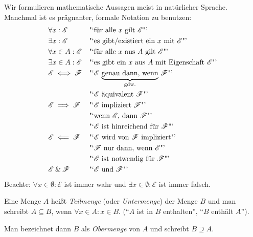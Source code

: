 \documentclass[../../main.tex]{subfiles}
\begin{document}
\begin{bemnt}\label{1.1.11}
Wir formulieren mathematische Aussagen meist in natürlicher Sprache. Manchmal ist es prägnanter, formale Notation zu benutzen:
\begin{align*}
& \forall x:\mathcal{E}&&\text{"`für alle $x$ gilt $\mathcal{E}$"'}\index{Allquantor@{\bf Allquantor} ($\forall$)}\\
& \exists x:\mathcal{E}&&\text{"`es gibt/existiert ein $x$ mit $\mathcal{E}$"'}\index{Existenzquantor@{\bf Existenzquantor} ($\exists$)}\\
& \forall x\in A:\mathcal{E}&&\text{"`für alle $x$ aus $A$ gilt $\mathcal{E}$"'}\\
& \exists x\in A:\mathcal{E}&&\text{"`es gibt ein $x$ aus $A$ mit Eigenschaft $\mathcal{E}$"'}\\
& \mathcal{E}\iff \mathcal{F}&& \text{"`$\mathcal{E}$
$\underbrace{\text{genau dann, wenn}}_{\text{gdw.}}$
$\mathcal{F}$"'}\index{Äquivalenz@{\bf Äquivalenz} ($\iff$)}\\
& && \text{"`$\mathcal{E}$ äquivalent $\mathcal{F}$"'}\\
& \mathcal{E} \implies \mathcal{F} && \text{"`$\mathcal{E}$ impliziert $\mathcal{F}$"'}\index{Implikation@{\bf Implikation} ($\implies$, $\impliedby$)}\\
& && \text{"`wenn $\mathcal{E}$, dann $\mathcal{F}$"'}\\
& && \text{"`$\mathcal{E}$ ist hinreichend für $\mathcal{F}$"'}\\
& \mathcal{E} \impliedby \mathcal{F} && \text{"`$\mathcal{E}$ wird von $\mathcal{F}$ impliziert"'}\index{Implikation@{\bf Implikation} ($\implies$, $\impliedby$)}\\
& && \text{"`$\mathcal{F}$ nur dann, wenn $\mathcal{E}$"'}\\
& && \text{"`$\mathcal{E}$ ist notwendig für $\mathcal{F}$"'}\\
& \mathcal{E} \et \mathcal{F} && \text{"`$\mathcal{E}$ und $\mathcal{F}$"'}
\end{align*}
Beachte: $\forall x\in \emptyset:\mathcal{E}$ ist immer wahr und $\exists x\in \emptyset:\mathcal{E}$ ist immer falsch.
\end{bemnt}

\begin{df}\label{1.1.12}
Eine Menge $A$ heißt \emph{Teilmenge} (oder \emph{Untermenge}) der Menge $B$ und man schreibt $A\subseteq B$, wenn $\forall x\in A: x\in B$. ("`$A$ ist in $B$ enthalten"', "`$B$ enthält $A$"').

Man bezeichnet dann $B$ als \emph{Obermenge} von $A$ und schreibt $B\supseteq A$.
\end{df}
\end{document}
